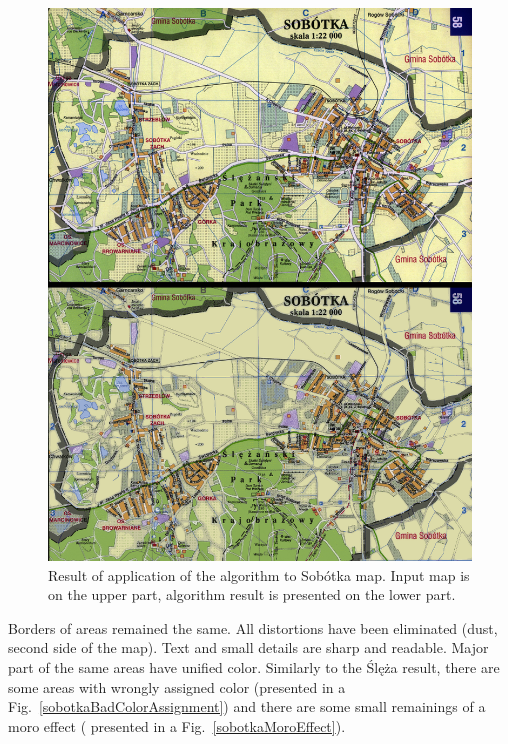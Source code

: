 \documentclass[a4paper,onecolumn,oneside,12pt]{memoir}
\begin{document}
\begin{figure}[!ht]
\begin{center}
\includegraphics[scale=1.5]{images/resultSobotkaFinal.png}
\caption{Result of application of the algorithm to Sobótka map. Input map is on the upper part,
algorithm result is presented on the lower part.}
\label{resultSobotkaFinal}
\end{center}
\end{figure}

Borders of areas remained the same. All distortions have been eliminated (dust, second side of the
map). Text and small details are sharp and readable. Major part of the same areas have unified
color. Similarly to the Ślęża result, there are some areas with wrongly assigned color (presented in
a Fig.~\ref{sobotkaBadColorAssignment}) and there are some small remainings of a moro effect (
presented in a Fig.~\ref{sobotkaMoroEffect}). \\
\end{document}
